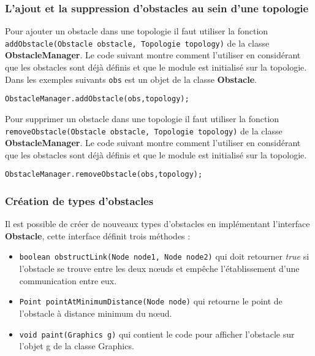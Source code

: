 \documentclass{article}
\begin{document}
\subsubsection{L'ajout et la suppression d'obstacles au sein d'une topologie}

Pour ajouter un obstacle dans une topologie il faut utiliser la fonction \texttt{addObstacle(Obstacle obstacle, Topologie topology)} de la classe \textbf{ObstacleManager}. Le code suivant montre comment l'utiliser en considérant que les obstacles sont déjà définis et que le module est initialisé sur la topologie. Dans les exemples suivants \texttt{obs} est un objet de la classe \textbf{Obstacle}.\smallskip
\begin{lstlisting}[frame=single]
ObstacleManager.addObstacle(obs,topology);
\end{lstlisting}\smallskip
Pour supprimer un obstacle dans une topologie il faut utiliser la fonction \texttt{removeObstacle(Obstacle obstacle, Topologie topology)} de la classe\\ \textbf{ObstacleManager}. Le code suivant montre comment l'utiliser en considérant que les obstacles sont déjà définis et que le module est initialisé sur la topologie.\smallskip
\begin{lstlisting}[frame=single]
ObstacleManager.removeObstacle(obs,topology);
\end{lstlisting}

\subsubsection{Création de types d'obstacles}

Il est possible de créer de nouveaux types d'obstacles en implémentant l'interface \textbf{Obstacle}, cette interface définit trois méthodes :\\
\begin{itemize}

\item \texttt{boolean obstructLink(Node node1, Node node2)} qui doit retourner \emph{true} si l'obstacle se trouve entre les deux n\oe uds et empêche l'établissement d'une communication entre eux.\\

\item \texttt{Point pointAtMinimumDistance(Node node)} qui retourne le point de l'obstacle à distance minimum du n\oe ud.\\

\item \texttt{void paint(Graphics g)} qui contient le code pour afficher l'obstacle sur l'objet g de la classe Graphics.\\
\end{itemize}
\end{document}
